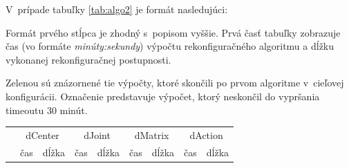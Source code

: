 \documentclass[
  printed, %
  oneside, %
  notable,   %
  nolof,     %
  nolot,     %
]{fithesis3}
\begin{document}
V~prípade tabuľky \ref{tab:algo2} je formát nasledujúci: 

Formát prvého stĺpca je zhodný s~popisom vyššie. Prvá časť tabuľky zobrazuje čas (vo formáte \textit{minúty:sekundy}) výpočtu rekonfiguračného algoritmu a dĺžku vykonanej rekonfiguračnej postupnosti. 

\colorbox{table-green}{Zelenou} sú znázornené tie výpočty, ktoré skončili po prvom algoritme v~cieľovej konfigurácii. Označenie \uv{--} predstavuje výpočet, ktorý neskončil do vypršania timeoutu 30 minút.

\begin{table}[hp!]
\centering
\begin{tabular}{c|cc|cc|cc|cc}
\multirow{2}{*}{} & \multicolumn{2}{c|}{dCenter} & \multicolumn{2}{c|}{dJoint} & \multicolumn{2}{c|}{dMatrix} & \multicolumn{2}{c}{dAction} \\
 & čas & dĺžka & čas & dĺžka & čas & dĺžka & čas & dĺžka \\ \hline


\end{tabular}
\end{table}
\end{document}
